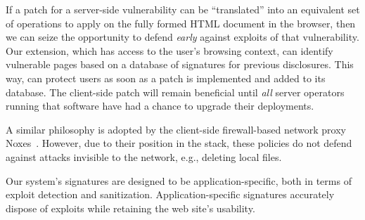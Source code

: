 If a patch for a server-side vulnerability can be ``translated'' into
an equivalent set of operations to apply on the fully formed HTML
document in the browser, then we can seize the opportunity to defend
{\em early} against exploits of that vulnerability.
%
Our extension, which has access to the user's browsing context, can
identify vulnerable pages based on a database of signatures for
previous disclosures. This way, \sys can protect users as soon as a patch
is implemented and added to its database. The client-side
patch will remain beneficial until \textit{all} server
operators running that software have had a chance to upgrade their
deployments. 


A similar philosophy is adopted by the client-side firewall-based network 
proxy Noxes~\cite{Kirda:2009:CCS:2639535.2639808}. 
However, due to their position in the stack, these policies do not defend against 
attacks invisible to the network, e.g., deleting local files.

Our system's signatures are designed to be application-specific, both
in terms of exploit detection and sanitization. %
Application-specific signatures accurately dispose
of exploits while retaining the web site's usability.






